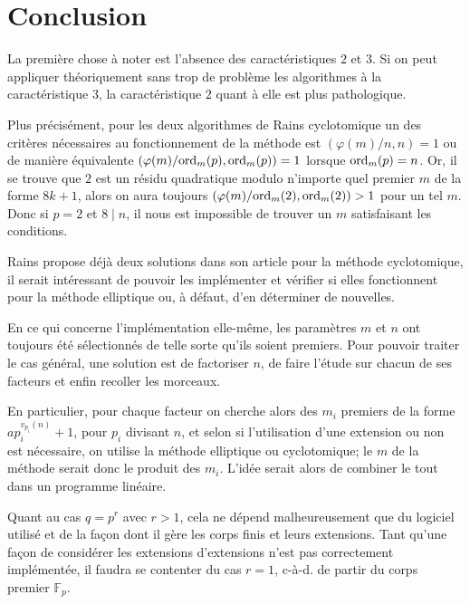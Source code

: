 \documentclass[a4paper]{article} %
\numberwithin{section}{part}
\numberwithin{equation}{section}
\newcommand\GF[1]{\mathbb{F}_{#1}}
\newcommand\ord[2]{\textup{ord}_{#1}(#2)}
\begin{document}
\newpage
\part{Conclusion}
\label{quatre}
La première chose à noter est l'absence des caractéristiques $2$ et $3$. Si on
peut appliquer théoriquement sans trop de problème les algorithmes à la
caractéristique $3$, la caractéristique $2$ quant à elle est plus
pathologique.\par
Plus précisément, pour les deux algorithmes de Rains cyclotomique un des 
critères nécessaires au fonctionnement de la méthode est $(\varphi(m)/n, n) = 1$
ou de manière équivalente $(\varphi(m)/\ord{m}{p},\ord{m}{p}) = 1$
lorsque $\ord{m}{p} = n$. Or, il se trouve que $2$ est un résidu
quadratique modulo n'importe quel premier $m$ de la forme $8k + 1$, alors on
aura toujours $(\varphi(m)/\ord{m}{2},\ord{m}{2}) > 1$ pour un tel
$m$. Donc si $p = 2$ et $8\mid n$, il nous est impossible de trouver un $m$
satisfaisant les conditions.\par
Rains propose déjà deux solutions dans son article pour la méthode cyclotomique,
il serait intéressant de pouvoir les implémenter et vérifier si elles
fonctionnent pour la méthode elliptique ou, à défaut, d'en déterminer de
nouvelles.

\vspace{0.3cm}

En ce qui concerne l'implémentation elle-même, les paramètres $m$ et $n$ ont 
toujours été sélectionnés de telle sorte qu'ils soient premiers. Pour pouvoir 
traiter le cas général, une solution est de factoriser $n$, de faire l'étude sur
chacun de ses facteurs et enfin recoller les morceaux.\par
En particulier, pour chaque facteur on cherche alors des $m_i$ premiers de la 
forme $ap_i^{v_{p_i}(n)} + 1$, pour $p_i$ divisant $n$, et selon si 
l'utilisation d'une extension ou non est nécessaire, on utilise la méthode 
elliptique ou cyclotomique; le $m$ de la méthode serait donc le produit des 
$m_i$. L'idée serait alors de combiner le tout dans un programme linéaire.\par
Quant au cas $q = p^r$ avec $r>1$, cela ne dépend malheureusement que du
logiciel utilisé et de la façon dont il gère les corps finis et leurs
extensions. Tant qu'une façon de considérer les extensions d'extensions 
n'est pas correctement implémentée, il faudra se contenter du cas $r = 1$,
c-à-d. de partir du corps premier $\GF{p}$.
\end{document}

